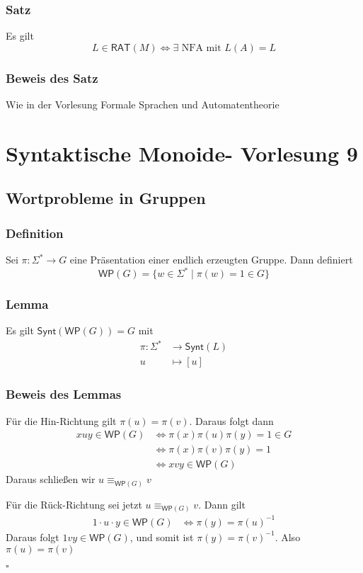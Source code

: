 \documentclass[12pt, german]{article}
\newcommand{\sigstern}{\Sigma^\ast}
\newcommand{\inv}{^{-1}}
\newcommand{\rat}{\mathsf{RAT}}
\newcommand{\synt}{\mathsf{Synt}}
\newcommand{\wop}{\mathsf{WP}}
\newcommand{\equivWP}{\equiv_{\mathsf{WP}(G)}}
\newcommand{\bewiesen}{
	
	\begin{flushright}
		$\square$  \\
\end{flushright}}
\begin{document}
	\subsubsection{Satz}
	Es gilt $$ L \in \rat(M) \iff \exists \text{ NFA mit } L(A) = L $$
	
	\subsubsection{Beweis des Satz}
	Wie in der Vorlesung Formale Sprachen und Automatentheorie
	
	\section{Syntaktische Monoide- Vorlesung 9}
	\subsection{Wortprobleme in Gruppen}
	\subsubsection{Definition}
	Sei $\pi : \sigstern \to G$ eine Präsentation einer endlich erzeugten Gruppe. Dann definiert $$\wop(G) = \{ w \in \sigstern \mid \pi(w)=1 \in G\}$$
	
	\subsubsection{Lemma}
	Es gilt $\synt(\wop(G))=G$ mit 
	\begin{align*}
		\pi : \sigstern &\to \synt(L) \\
		u &\mapsto [u]
	\end{align*}
	
	\subsubsection{Beweis des Lemmas}
	Für die Hin-Richtung gilt $\pi(u) = \pi(v)$. Daraus folgt dann
	\begin{align*}
		xuy \in \wop(G) &\iff \pi(x)\pi(u)\pi(y) = 1 \in G \\
		&\iff \pi(x)\pi(v)\pi(y) = 1 \\
		&\iff xvy \in \wop(G)
	\end{align*}
	Daraus schließen wir $u \equivWP v$
	\newline
	
	Für die Rück-Richtung sei jetzt $u \equivWP v$. Dann gilt 
	\begin{align*}
		1\cdot u \cdot y \in \wop(G) &\iff  \pi(y) = \pi(u)\inv
	\end{align*}
	Daraus folgt $1vy \in \wop(G)$, und somit ist $\pi(y) = \pi(v)\inv$. Also $\pi(u) = \pi(v)$
	\bewiesen
	
\end{document}
